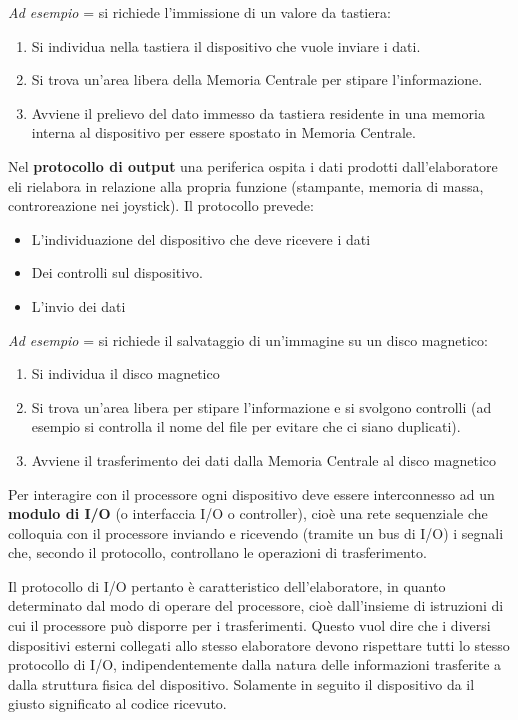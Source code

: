 \documentclass[12pt]{article} %
\begin{document}
\textit{Ad esempio} = si richiede l’immissione di un valore da tastiera:
\begin{enumerate}
    \item Si individua nella tastiera il dispositivo che vuole inviare i dati.
    \item Si trova un’area libera della Memoria Centrale per stipare l’informazione.
    \item Avviene il prelievo del dato immesso da tastiera residente in una memoria interna al dispositivo per essere spostato in Memoria Centrale.
\end{enumerate}
\newpage \noindent Nel \textbf{protocollo di output} una periferica ospita i dati prodotti dall’elaboratore eli rielabora in relazione alla propria funzione (stampante, memoria di massa, controreazione nei joystick).
Il protocollo prevede:
\begin{itemize}
    \item L’individuazione del dispositivo che deve ricevere i dati
    \item Dei controlli sul dispositivo.
    \item L’invio dei dati\par\medskip\noindent
\end{itemize}
\textit{Ad esempio} = si richiede il salvataggio di un'immagine su un disco magnetico:
\begin{enumerate}
    \item Si individua il disco magnetico
    \item Si trova un’area libera per stipare l’informazione e si svolgono controlli (ad esempio si controlla il nome del file per evitare che ci siano duplicati).
    \item Avviene il trasferimento dei dati dalla Memoria Centrale al disco magnetico
\end{enumerate}
Per interagire con il processore ogni dispositivo deve essere interconnesso ad un \textbf{modulo di I/O} (o interfaccia I/O o controller), cioè una rete sequenziale che colloquia con il processore inviando e ricevendo (tramite un bus di I/O) i segnali che, secondo il protocollo, controllano le operazioni di trasferimento.\par\medskip\noindent
Il protocollo di I/O pertanto è caratteristico dell’elaboratore, in quanto determinato dal modo di operare del processore, cioè dall’insieme di istruzioni di cui il processore può disporre per i trasferimenti. Questo vuol dire che i diversi dispositivi esterni collegati allo stesso elaboratore devono rispettare tutti lo stesso protocollo di I/O, indipendentemente dalla natura delle informazioni trasferite a dalla struttura fisica del dispositivo. Solamente in seguito il dispositivo da il giusto significato al codice ricevuto. \par\medskip\noindent
\end{document}

